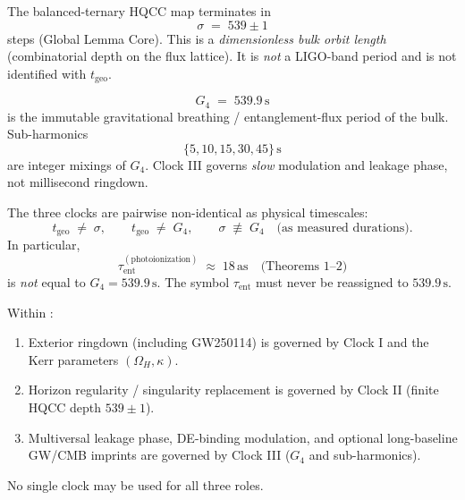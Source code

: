 \begin{definition}
\label{def:clock-II}
The balanced-ternary HQCC map terminates in
\[
\sigma \;=\; 539\pm 1
\]
steps (Global Lemma Core). This is a \emph{dimensionless bulk orbit length}
(combinatorial depth on the flux lattice). It is \emph{not} a LIGO-band period
and is not identified with \(t_{\mathrm{geo}}\).
\end{definition}

\begin{definition}
\label{def:clock-III}
\[
G_4 \;=\; 539.9\,\mathrm{s}
\]
is the immutable gravitational breathing / entanglement-flux period of the bulk.
Sub-harmonics
\[
\{5,10,15,30,45\}\,\mathrm{s}
\]
are integer mixings of \(G_4\). Clock III governs \emph{slow} modulation and
leakage phase, not millisecond ringdown.
\end{definition}

\begin{lemma}
\label{lem:non-id}
The three clocks are pairwise non-identical as physical timescales:
\[
t_{\mathrm{geo}}\;\not=\;\sigma,\qquad
t_{\mathrm{geo}}\;\not=\;G_4,\qquad
\sigma\;\not\equiv\;G_4
\quad\text{(as measured durations)}.
\]
In particular,
\[
\tau_{\mathrm{ent}}^{\mathrm{(photoionization)}}
\;\approx\; 18\,\mathrm{as}
\quad\text{(Theorems 1--2)}
\]
is \emph{not} equal to \(G_4=539.9\,\mathrm{s}\). The symbol \(\tau_{\mathrm{ent}}\)
must never be reassigned to \(539.9\,\mathrm{s}\).
\end{lemma}

\begin{theorem}
\label{thm:three-clocks}
Within \model:
\begin{enumerate}[label=(\roman*)]
  \item Exterior ringdown (including GW250114) is governed by Clock I and the
        Kerr parameters \((\Omega_H,\kappa)\).
  \item Horizon regularity / singularity replacement is governed by Clock II
        (finite HQCC depth \(539\pm 1\)).
  \item Multiversal leakage phase, DE-binding modulation, and optional
        long-baseline GW/CMB imprints are governed by Clock III (\(G_4\) and
        sub-harmonics).
\end{enumerate}
No single clock may be used for all three roles.
\end{theorem}

